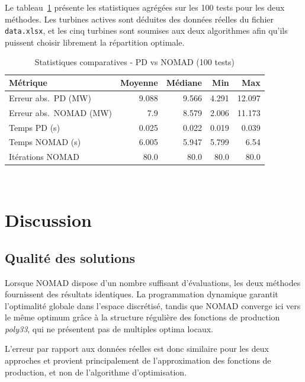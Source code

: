 \documentclass[12pt, letterpaper]{report}
\begin{document}
Le tableau~\ref{tab:recap_p3} présente les statistiques agrégées sur les 100 tests pour les deux méthodes. Les turbines actives sont déduites des données réelles du fichier \texttt{data.xlsx}, et les cinq turbines sont soumises aux deux algorithmes afin qu'ils puissent choisir librement la répartition optimale.

\begin{table}[H]
  \centering
  \caption{Statistiques comparatives - PD vs NOMAD (100 tests)}
  \label{tab:recap_p3}
  \begin{tabular}{lrrrr}
    \toprule
    Métrique & Moyenne & Médiane & Min & Max \\
    \midrule
    Erreur abs.\ PD (MW)    & 9.088 & 9.566 & 4.291 & 12.097 \\
    Erreur abs.\ NOMAD (MW) & 7.9 & 8.579 & 2.006 & 11.173 \\
    Temps PD (s)            & 0.025 & 0.022 & 0.019 & 0.039 \\
    Temps NOMAD (s)         & 6.005 & 5.947 & 5.799 & 6.54 \\
    Itérations NOMAD        & 80.0 & 80.0 & 80.0 & 80.0 \\
    \bottomrule
  \end{tabular}
  \medskip\\
\end{table}





\section{Discussion}

\subsection{Qualité des solutions}

Lorsque NOMAD dispose d'un nombre suffisant d'évaluations, les deux méthodes fournissent des résultats identiques. La programmation dynamique garantit l'optimalité globale dans l'espace discrétisé, tandis que NOMAD converge ici vers le même optimum grâce à la structure régulière des fonctions de production \textit{poly33}, qui ne présentent pas de multiples optima locaux.

L'erreur par rapport aux données réelles est donc similaire pour les deux approches et provient principalement de l'approximation des fonctions de production, et non de l'algorithme d'optimisation.
\end{document}

